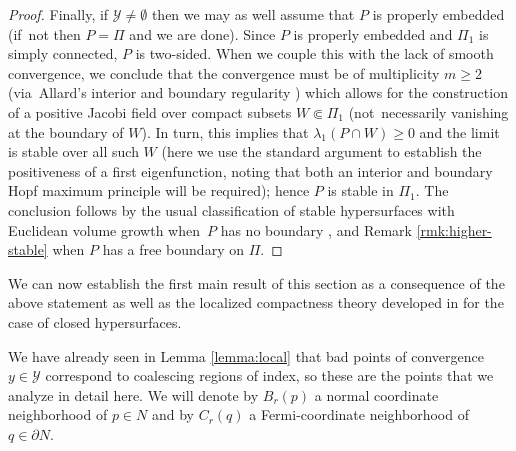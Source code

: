\documentclass[10pt]{amsart}
\let\mathcal\mathscr
\newcounter{cas}
\theoremstyle{definition}
\let\cemb\Subset
\begin{document}
\begin{proof}
Finally, if $\mathcal{Y}\neq \emptyset$ then we may as well assume that $P$ is properly embedded (if~not then $P=\Pi$ and we are done). Since $P$ is properly embedded and $\Pi_1$ is simply connected, $P$ is two-sided. When we couple this with the lack of smooth convergence, we conclude that the convergence must be of multiplicity $m\geq 2$ (via~Allard's interior and boundary regularity \cf \cite[Ths.\,5,\,17]{ACS17}) which allows for the construction of a positive Jacobi field over compact subsets $W\cemb \Pi_1$ (not~necessarily vanishing at the boundary of $W$). In turn, this implies that $\lambda_1(P\cap W)\geq 0$ and the limit is stable over all such $W$ (here we use the standard argument to establish the positiveness of a first eigenfunction, noting that both an interior and boundary Hopf maximum principle will be required); hence $P$ is stable in $\Pi_1$. The conclusion follows by the usual classification of stable hypersurfaces with Euclidean volume growth when~$P$ has no boundary \cite{SS81}, and Remark \ref{rmk:higher-stable} when $P$ has a free boundary on $\Pi$.
\end{proof}

We can now establish the first main result of this section as a consequence of the above statement as well as the localized compactness theory developed in \cite[\S2]{BS17} for the case of closed hypersurfaces.

We have already seen in Lemma \ref{lemma:local} that bad points of convergence $y\in \mathcal{Y}$ correspond to coalescing regions of index, so these are the points that we analyze in detail here. We will denote by $B_r(p)$ a normal coordinate neighborhood of $p\in N$ and by $C_r(q)$ a Fermi-coordinate neighborhood of $q\in \partial N$.
\end{document}
